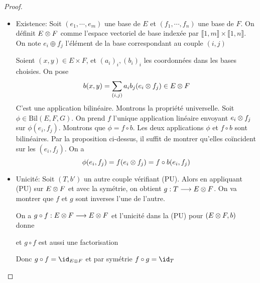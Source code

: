 \begin{proof}~
\begin{itemize}
    \item Existence: Soit $(e_1, \cdots , e_m)$ une base de $E$ et  $(f_1, \cdots , f_n)$ une base de $F$. On définit  $E\otimes F$ comme l'espace vectoriel de base indexée par  $\llbracket 1,m \rrbracket \times \llbracket 1,n \rrbracket $. On note $e_i\oplus f_j$ l'élément de la base correspondant au couple  $(i, j)$ 
    
        Soient $(x, y) \in  E\times F$, et $(a_i)_i, (b_i)_i$ les coordonnées dans les bases choisies. On pose \[
            b(x, y)= \sum_{(i, j)} a_ib_j(e_i\otimes f_j) \in  E\otimes F
        \] 
        C'est une application bilinéaire. Montrons la propriété universelle. Soit $\phi \in  \mathrm{Bil}(E, F, G)$. On prend $f$ l'unique application linéaire envoyant  $e_i\otimes f_j$ sur  $\phi(e_i, f_j)$. Montrons que  $\phi=f\circ b$. Les deux applications  $\phi$ et  $f\circ b$ sont bilinéaires. Par la proposition ci-dessus, il suffit de montrer qu'elles coïncident sur  les $(e_i, f_j)$. On a  \[
            \phi(e_i, f_j)=f(e_i\otimes f_j)=f\circ b(e_i, f_j)
        \] 
    \item Unicité: Soit $(T, b')$ un autre couple vérifiant  (PU). Alors en appliquant (PU) sur $E\otimes F$ et avec la symétrie, on obtient  $g:T\longrightarrow E\otimes F$. On va montrer que $f$ et  $g$ sont inverses l'une de l'autre.
 \begin{center}
\end{center}
On a $g\circ f: E\otimes F \longrightarrow E\otimes F$ et l'unicité dans la (PU) pour $(E\otimes F, b)$ donne 
 \begin{center}
\end{center}
et $g\circ f$ est aussi une factorisation
 \begin{center}
\end{center}
Donc $g\circ f=\id_{E\tens F}$ et par symétrie $f\circ g=\id_T$
\end{itemize}
\end{proof}

